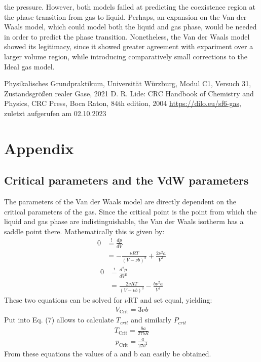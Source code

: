 \documentclass[a4paper,10pt,twocolumn]{article}
\begin{document}
    the pressure.
    However, both models failed at predicting the coexistence region at the phase transition from gas to liquid.
    Perhaps, an expansion on the Van der Waals model, which could model both the liquid and gas phase, would be needed in order to predict the phase transition.
    Nonetheless, the Van der Waals model showed its legitimacy, since it showed greater agreement with expariment over a larger volume region, while introducing comparatively small
    corrections to the Ideal gas model.
    \begin{thebibliography}{}    %
         Physikalisches Grundpraktikum, Universität Würzburg, Modul C1, Versuch 31, Zustandsgrößen realer Gase, 2021
         D. R. Lide: \grqq CRC Handbook of Chemistry
        and Physics\grqq , CRC Press, Boca Raton, 84th
        edition, 2004
         \url{https://dilo.eu/sf6-gas}, zuletzt aufgerufen am 02.10.2023
    \end{thebibliography}
    \clearpage
    \section[]{Appendix}\label{sec:apendix}
    \subsection{Critical parameters and the VdW parameters}\label{subsec:criticalParams}
    The parameters of the Van der Waals model are directly dependent on the critical parameters of the gas.
    Since the critical point is the point from which the liquid and gas phase are indistinguishable, the Van der Waals isotherm has a saddle point there.
    Mathematically this is given by:
    \begin{equation}\label{eq:anh1}
    \begin{split}
        0 & \overset{!}{=}\frac{dp}{dV}\\
        & =-\frac{\nu R T}{(V-\nu b)^2}+\frac{2 \nu^2 a}{V^3}
    \end{split}
    \end{equation}
\begin{equation}\label{eq:anh2}
\begin{split}
    0 & \overset{!}{=}\frac{d^2p}{dV^2}\\
    & =\frac{2 \nu R T}{(V-\nu b)^3}-\frac{b \nu^2 a}{V^4}
\end{split}
\end{equation}
These two equations can be solved for $\nu$RT and set equal, yielding:
\begin{align}
    V_\text{Crit} = 3\nu b
\end{align}
Put into Eq. (7) allows to calculate $T_{crit}$ and similarly $P_{crit}$
\begin{align}
    T_\text{Crit}=\frac{8a}{27bR}
\end{align}
\begin{align}
    p_\text{Crit}=\frac{a}{27b^2}
\end{align}
    From these equations the values of a and b can easily be obtained.
\end{document}
